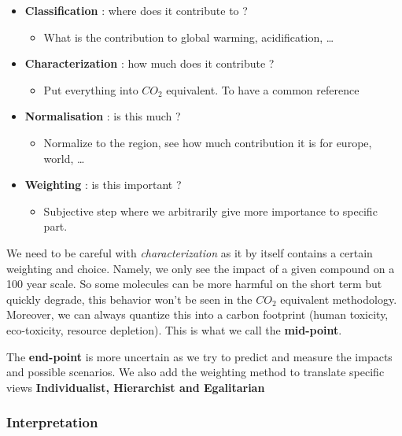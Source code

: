 \begin{itemize}
\tightlist
\item
  \textbf{Classification} : where does it contribute to ?

  \begin{itemize}
  \tightlist
  \item
    What is the contribution to global warming, acidification, \ldots{}
  \end{itemize}
\item
  \textbf{Characterization} : how much does it contribute ?

  \begin{itemize}
  \tightlist
  \item
    Put everything into \(CO_2\) equivalent. To have a common reference
  \end{itemize}
\item
  \textbf{Normalisation} : is this much ?

  \begin{itemize}
  \tightlist
  \item
    Normalize to the region, see how much contribution it is for europe,
    world, \ldots{}
  \end{itemize}
\item
  \textbf{Weighting} : is this important ?

  \begin{itemize}
  \tightlist
  \item
    Subjective step where we arbitrarily give more importance to
    specific part.
  \end{itemize}
\end{itemize}

We need to be careful with \emph{characterization} as it by itself
contains a certain weighting and choice. Namely, we only see the impact
of a given compound on a 100 year scale. So some molecules can be more
harmful on the short term but quickly degrade, this behavior won't be
seen in the \(CO_2\) equivalent methodology. Moreover, we can always
quantize this into a carbon footprint (human toxicity, eco-toxicity,
resource depletion). This is what we call the \textbf{mid-point}.

The \textbf{end-point} is more uncertain as we try to predict and
measure the impacts and possible scenarios. We also add the weighting
method to translate specific views \textbf{Individualist, Hierarchist
and Egalitarian}

\hypertarget{interpretation}{%
\subsubsection{Interpretation}\label{interpretation}}

